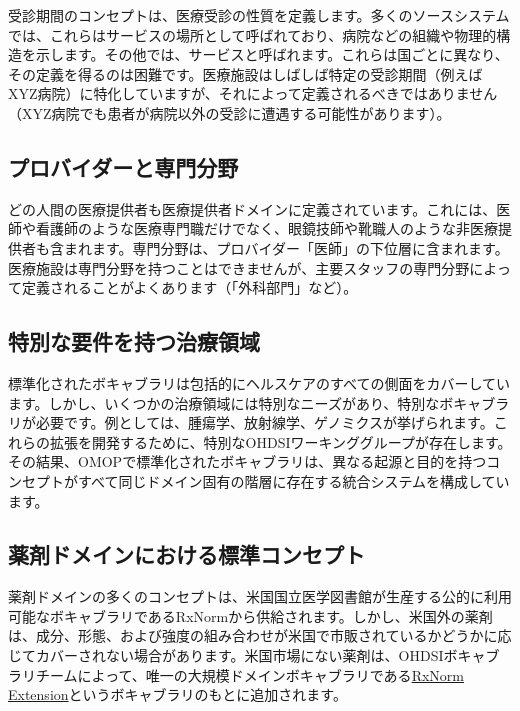 \documentclass[
  11pt]{book}
\theoremstyle{definition}
\theoremstyle{definition}
\theoremstyle{definition}
\theoremstyle{definition}
\theoremstyle{remark}
\begin{document}
受診期間のコンセプトは、医療受診の性質を定義します。多くのソースシステムでは、これらはサービスの場所として呼ばれており、病院などの組織や物理的構造を示します。その他では、サービスと呼ばれます。これらは国ごとに異なり、その定義を得るのは困難です。医療施設はしばしば特定の受診期間（例えばXYZ病院）に特化していますが、それによって定義されるべきではありません（XYZ病院でも患者が病院以外の受診に遭遇する可能性があります）。

\subsection{プロバイダーと専門分野}\label{ux30d7ux30edux30d0ux30a4ux30c0ux30fcux3068ux5c02ux9580ux5206ux91ce}

どの人間の医療提供者も医療提供者ドメインに定義されています。これには、医師や看護師のような医療専門職だけでなく、眼鏡技師や靴職人のような非医療提供者も含まれます。専門分野は、プロバイダー「医師」の下位層に含まれます。医療施設は専門分野を持つことはできませんが、主要スタッフの専門分野によって定義されることがよくあります（「外科部門」など）。

\subsection{特別な要件を持つ治療領域}\label{ux7279ux5225ux306aux8981ux4ef6ux3092ux6301ux3064ux6cbbux7642ux9818ux57df}

標準化されたボキャブラリは包括的にヘルスケアのすべての側面をカバーしています。しかし、いくつかの治療領域には特別なニーズがあり、特別なボキャブラリが必要です。例としては、腫瘍学、放射線学、ゲノミクスが挙げられます。これらの拡張を開発するために、特別なOHDSIワーキンググループが存在します。その結果、OMOPで標準化されたボキャブラリは、異なる起源と目的を持つコンセプトがすべて同じドメイン固有の階層に存在する統合システムを構成しています。

\subsection{薬剤ドメインにおける標準コンセプト}\label{rxNormExtension}

薬剤ドメインの多くのコンセプトは、米国国立医学図書館が生産する公的に利用可能なボキャブラリであるRxNormから供給されます。しかし、米国外の薬剤は、成分、形態、および強度の組み合わせが米国で市販されているかどうかに応じてカバーされない場合があります。米国市場にない薬剤は、OHDSIボキャブラリチームによって、唯一の大規模ドメインボキャブラリである\href{https://www.ohdsi.org/web/wiki/doku.php?id=documentation:vocabulary:rxnorm_extension}{RxNorm Extension}というボキャブラリのもとに追加されます。
\end{document}

